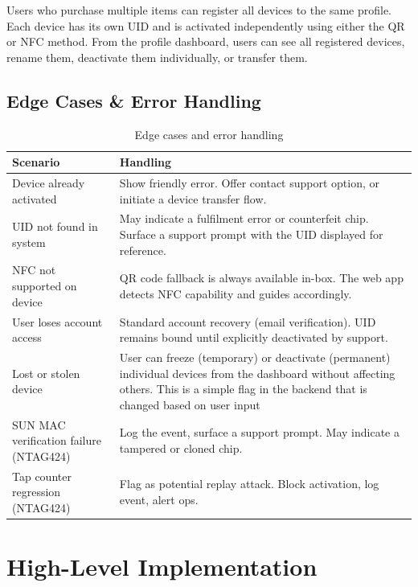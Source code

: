 \documentclass[
	a4paper, %
]{ChaosEngineReport}
\begin{document}
Users who purchase multiple items can register all devices to the same profile. Each device has its own UID and is activated independently using either the QR or NFC method. From the profile dashboard, users can see all registered devices, rename them, deactivate them individually, or transfer them.

\subsection{Edge Cases \& Error Handling}

\begin{table}[h!]
\centering
\small
{}
\begin{tabularx}{\linewidth}{@{} L{3.8cm} X @{}}
  \toprule
  \textbf{Scenario} &
  \textbf{Handling} \\
  \midrule
  Device already activated & Show friendly error. Offer contact support option, or initiate a device transfer flow. \\
  UID not found in system & May indicate a fulfilment error or counterfeit chip. Surface a support prompt with the UID displayed for reference. \\
  NFC not supported on device & QR code fallback is always available in-box. The web app detects NFC capability and guides accordingly. \\
  User loses account access & Standard account recovery (email verification). UID remains bound until explicitly deactivated by support. \\
  Lost or stolen device & User can freeze (temporary) or deactivate (permanent) individual devices from the dashboard without affecting others. This is a simple flag in the backend that is changed based on user input \\
  SUN MAC verification failure (NTAG424) & Log the event, surface a support prompt. May indicate a tampered or cloned chip. \\
  Tap counter regression (NTAG424) & Flag as potential replay attack. Block activation, log event, alert ops. \\
\end{tabularx}
\caption{Edge cases and error handling}
\end{table}

\newpage

\section{High-Level Implementation}
\end{document}
